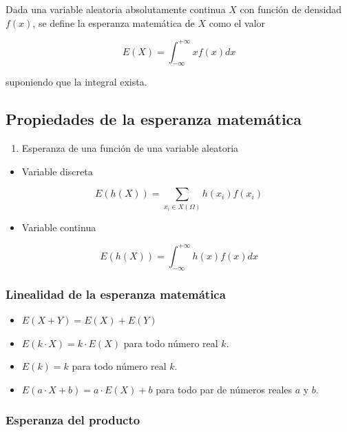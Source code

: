 \documentclass[
]{article}
\providecommand{\tightlist}{%
  \setlength{\itemsep}{0pt}\setlength{\parskip}{0pt}}
\begin{document}
Dada una variable aleatoria absolutamente continua \(X\) con función de
densidad \(f(x)\), se define la esperanza matemática de \(X\) como el valor

\[
E(X)=\int_{-\infty}^{+\infty} x f(x) d x
\]

suponiendo que la integral exista.

\subsection{Propiedades de la esperanza matemática}\label{propiedades-de-la-esperanza-matemuxe1tica}

\begin{enumerate}
\def\labelenumi{\arabic{enumi}.}
\tightlist
\item
  Esperanza de una función de una variable aleatoria
\end{enumerate}

\begin{itemize}
\tightlist
\item
  Variable discreta
\end{itemize}

\[
E(h(X))=\sum_{x_{i} \in X(\Omega)} h\left(x_{i}\right) f\left(x_{i}\right)
\]

\begin{itemize}
\tightlist
\item
  Variable continua
\end{itemize}

\[
E(h(X))=\int_{-\infty}^{+\infty} h(x) f(x) d x
\]

\subsubsection{Linealidad de la esperanza matemática}\label{linealidad-de-la-esperanza-matemuxe1tica}

\begin{itemize}
\item
  \(E(X+Y)=E(X)+E(Y)\)
\item
  \(E(k \cdot X)=k \cdot E(X)\) para todo número real \(k\).
\item
  \(E(k)=k\) para todo número real \(k\).
\item
  \(E(a \cdot X+b)=a \cdot E(X)+b\) para todo par de números reales \(a\) y
  \(b\).
\end{itemize}

\subsubsection{Esperanza del producto}\label{esperanza-del-producto}
\end{document}
